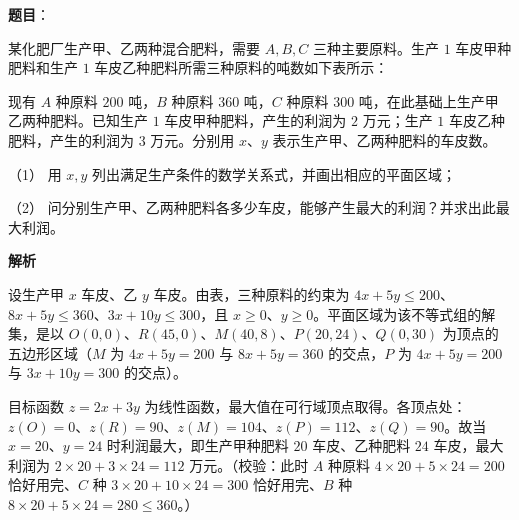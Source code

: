 \begin{answer}

\textbf{题目}：

某化肥厂生产甲、乙两种混合肥料，需要 \(A,B,C\) 三种主要原料。生产 \(1\) 车皮甲种肥料和生产 \(1\) 车皮乙种肥料所需三种原料的吨数如下表所示：
\nopagebreak[4]
\begin{center}\end{center}
\nopagebreak[4]
现有 \(A\) 种原料 \(200\) 吨，\(B\) 种原料 \(360\) 吨，\(C\) 种原料 \(300\) 吨，在此基础上生产甲乙两种肥料。已知生产 \(1\) 车皮甲种肥料，产生的利润为 \(2\) 万元；生产 \(1\) 车皮乙种肥料，产生的利润为 \(3\) 万元。分别用 \(x\)、\(y\) 表示生产甲、乙两种肥料的车皮数。

（1） 用 \(x,y\) 列出满足生产条件的数学关系式，并画出相应的平面区域；

（2） 问分别生产甲、乙两种肥料各多少车皮，能够产生最大的利润？并求出此最大利润。

\textbf{解析}


设生产甲 \(x\) 车皮、乙 \(y\) 车皮。由表，三种原料的约束为 \(4x+5y\leqslant 200\)、\(8x+5y\leqslant 360\)、\(3x+10y\leqslant 300\)，且 \(x\geqslant 0\)、\(y\geqslant 0\)。平面区域为该不等式组的解集，是以 \(O(0,0)\)、\(R(45,0)\)、\(M(40,8)\)、\(P(20,24)\)、\(Q(0,30)\) 为顶点的五边形区域（\(M\) 为 \(4x+5y=200\) 与 \(8x+5y=360\) 的交点，\(P\) 为 \(4x+5y=200\) 与 \(3x+10y=300\) 的交点）。


目标函数 \(z=2x+3y\) 为线性函数，最大值在可行域顶点取得。各顶点处：\(z(O)=0\)、\(z(R)=90\)、\(z(M)=104\)、\(z(P)=112\)、\(z(Q)=90\)。故当 \(x=20\)、\(y=24\) 时利润最大，即生产甲种肥料 \(20\) 车皮、乙种肥料 \(24\) 车皮，最大利润为 \(2\times 20+3\times 24=112\) 万元。（校验：此时 \(A\) 种原料 \(4\times 20+5\times 24=200\) 恰好用完、\(C\) 种 \(3\times 20+10\times 24=300\) 恰好用完、\(B\) 种 \(8\times 20+5\times 24=280\leqslant 360\)。）



\end{answer}

